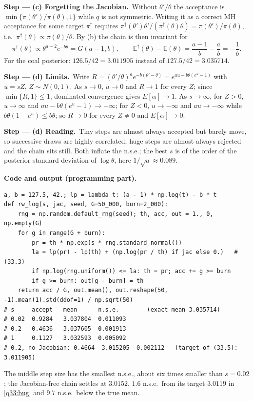 \documentclass[11pt,a4paper]{article}
\numberwithin{equation}{questao}   %
\newcommand{\passo}[2]{\par\smallskip\noindent\textbf{Step --- #1.}~#2}
\newcommand{\codehead}{\par\smallskip\noindent\textbf{Code and output (programming part).}\par}
\newcommand{\E}{\mathbb{E}}
\newcommand{\1}{\mathbf{1}}
\begin{document}
\begin{sol}
\passo{(c) Forgetting the Jacobian}{Without $\theta'/\theta$ the acceptance is
$\min\{\pi(\theta')/\pi(\theta),1\}$ while $q$ is not symmetric. Writing it as a correct MH acceptance
for some target $\pi^\dagger$ requires $\pi^\dagger(\theta')\theta'/(\pi^\dagger(\theta)\theta)=\pi(\theta')/\pi(\theta)$,
i.e.\ $\pi^\dagger(\theta)\propto\pi(\theta)/\theta$. By (b) the chain is then invariant for}
\begin{equation}\label{q33:bug}
\pi^\dagger(\theta)\propto\theta^{a-2}e^{-b\theta}=G(a-1,b),\qquad \E^\dagger(\theta)-\E(\theta)=\frac{a-1}{b}-\frac ab=-\frac1b .
\end{equation}
For the coal posterior: $126.5/42=3.011905$ instead of $127.5/42=3.035714$.

\passo{(d) Limits}{Write $R=(\theta'/\theta)^ae^{-b(\theta'-\theta)}=e^{au-b\theta(e^u-1)}$ with $u=s Z$,
$Z\sim N(0,1)$. As $s\to0$, $u\to0$ and $R\to1$ for every $Z$; since $\min\{R,1\}\le1$, dominated
convergence gives $E[\alpha]\to1$. As $s\to\infty$, for $Z>0$, $u\to\infty$ and
$au-b\theta(e^u-1)\to-\infty$; for $Z<0$, $u\to-\infty$ and $au\to-\infty$ while $b\theta(1-e^{u})\le b\theta$;
so $R\to0$ for every $Z\ne0$ and $E[\alpha]\to0$.}

\passo{(d) Reading}{Tiny steps are almost always accepted but barely move, so successive draws are
highly correlated; huge steps are almost always rejected and the chain sits still. Both inflate the
n.s.e.; the best $s$ is of the order of the posterior standard deviation of $\log\theta$, here
$1/\sqrt{a}\approx0.089$.}

\codehead
{\small
\begin{verbatim}
a, b = 127.5, 42.; lp = lambda t: (a - 1) * np.log(t) - b * t
def rw_log(s, jac, seed, G=50_000, burn=2_000):
    rng = np.random.default_rng(seed); th, acc, out = 1., 0, np.empty(G)
    for g in range(G + burn):
        pr = th * np.exp(s * rng.standard_normal())
        la = lp(pr) - lp(th) + (np.log(pr / th) if jac else 0.)   # (33.3)
        if np.log(rng.uniform()) <= la: th = pr; acc += g >= burn
        if g >= burn: out[g - burn] = th
    return acc / G, out.mean(), out.reshape(50, -1).mean(1).std(ddof=1) / np.sqrt(50)
# s     accept   mean      n.s.e.        (exact mean 3.035714)
# 0.02  0.9284   3.037804  0.011093
# 0.2   0.4636   3.037605  0.001913
# 1     0.1127   3.032593  0.005092
# 0.2, no Jacobian: 0.4664  3.015205  0.002112   (target of (33.5): 3.011905)
\end{verbatim}
}
The middle step size has the smallest n.s.e., about six times smaller than $s=0.02$; the
Jacobian-free chain settles at $3.0152$, $1.6$ n.s.e.\ from its target $3.0119$ in \eqref{q33:bug}
and $9.7$ n.s.e.\ below the true mean.


\end{sol}
\end{document}
